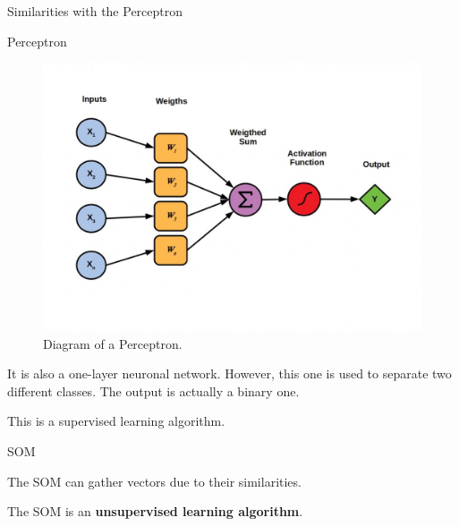 \documentclass{beamer}
\begin{document}
	\begin{frame}{Similarities with the Perceptron}
	
		\begin{block}{Perceptron}

			\begin{center}
				
				\begin{figure}[h]

					\includegraphics[width=0.4\linewidth]{pics/Perceptrons-1024x724.jpeg}
					\caption{Diagram of a Perceptron.}	
				\end{figure}
			\end{center}

			It is also a one-layer neuronal network. However, this one is used to separate two different classes. The output is actually a binary one. 

			This is a supervised learning algorithm.
		\end{block}

		
		\begin{block}{SOM}
		
			The SOM can gather vectors due to their similarities.

			The SOM is an \textbf{unsupervised learning algorithm}.
		\end{block}



	\end{frame}
	
\end{document}
